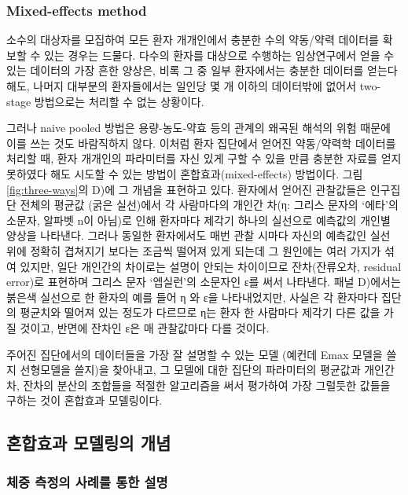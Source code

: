 \documentclass[
  10pt,
]{krantz}
\begin{document}
\hypertarget{mixed-effects-method}{%
\subsubsection{Mixed-effects method}\label{mixed-effects-method}}

소수의 대상자를 모집하여 모든 환자 개개인에서 충분한 수의 약동/약력 데이터를 확보할 수 있는 경우는 드물다. 다수의 환자를 대상으로 수행하는 임상연구에서 얻을 수 있는 데이터의 가장 흔한 양상은, 비록 그 중 일부 환자에서는 충분한 데이터를 얻는다 해도, 나머지 대부분의 환자들에서는 일인당 몇 개 이하의 데이터밖에 없어서 two-stage 방법으로는 처리할 수 없는 상황이다.

그러나 naive pooled 방법은 용량-농도-약효 등의 관계의 왜곡된 해석의 위험 때문에 이를 쓰는 것도 바람직하지 않다. 이처럼 환자 집단에서 얻어진 약동/약력학 데이터를 처리할 때, 환자 개개인의 파라미터를 자신 있게 구할 수 있을 만큼 충분한 자료를 얻지 못하였다 해도 시도할 수 있는 방법이 혼합효과(mixed-effects) 방법이다. 그림 \ref{fig:three-ways}의 D)에 그 개념을 표현하고 있다. 환자에서 얻어진 관찰값들은 인구집단 전체의 평균값 (굵은 실선)에서 각 사람마다의 개인간 차(η: 그리스 문자의 `에타'의 소문자, 알파벳 n이 아님)로 인해 환자마다 제각기 하나의 실선으로 예측값의 개인별 양상을 나타낸다. 그러나 동일한 환자에서도 매번 관찰 시마다 자신의 예측값인 실선 위에 정확히 겹쳐지기 보다는 조금씩 떨어져 있게 되는데 그 원인에는 여러 가지가 섞여 있지만, 일단 개인간의 차이로는 설명이 안되는 차이이므로 잔차(잔류오차, residual error)로 표현하며 그리스 문자 `엡실런'의 소문자인 ε를 써서 나타낸다. 패널 D)에서는 붉은색 실선으로 한 환자의 예를 들어 η 와 ε을 나타내었지만, 사실은 각 환자마다 집단의 평균치와 떨어져 있는 정도가 다르므로 η는 환자 한 사람마다 제각기 다른 값을 가질 것이고, 반면에 잔차인 ε은 매 관찰값마다 다를 것이다.

주어진 집단에서의 데이터들을 가장 잘 설명할 수 있는 모델 (예컨데 Emax 모델을 쓸지 선형모델을 쓸지)을 찾아내고, 그 모델에 대한 집단의 파라미터의 평균값과 개인간 차, 잔차의 분산의 조합들을 적절한 알고리즘을 써서 평가하여 가장 그럴듯한 값들을 구하는 것이 혼합효과 모델링이다.

\hypertarget{uxd63cuxd569uxd6a8uxacfc-uxbaa8uxb378uxb9c1uxc758-uxac1cuxb150}{%
\subsection{혼합효과 모델링의 개념}\label{uxd63cuxd569uxd6a8uxacfc-uxbaa8uxb378uxb9c1uxc758-uxac1cuxb150}}

\hypertarget{uxccb4uxc911-uxce21uxc815uxc758-uxc0acuxb840uxb97c-uxd1b5uxd55c-uxc124uxba85}{%
\subsubsection{체중 측정의 사례를 통한 설명}\label{uxccb4uxc911-uxce21uxc815uxc758-uxc0acuxb840uxb97c-uxd1b5uxd55c-uxc124uxba85}}
\end{document}
